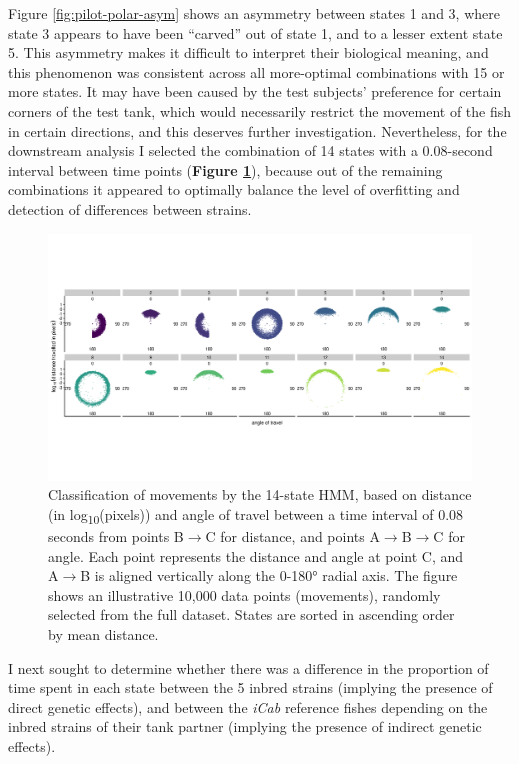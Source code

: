 \documentclass[
]{book}
\begin{document}
Figure \ref{fig:pilot-polar-asym} shows an asymmetry between states 1 and 3, where state 3 appears to have been ``carved'' out of state 1, and to a lesser extent state 5. This asymmetry makes it difficult to interpret their biological meaning, and this phenomenon was consistent across all more-optimal combinations with 15 or more states. It may have been caused by the test subjects' preference for certain corners of the test tank, which would necessarily restrict the movement of the fish in certain directions, and this deserves further investigation. Nevertheless, for the downstream analysis I selected the combination of 14 states with a 0.08-second interval between time points (\textbf{Figure \ref{fig:pilot-polar}}), because out of the remaining combinations it appeared to optimally balance the level of overfitting and detection of differences between strains.



\begin{figure}
\includegraphics[width=1\linewidth]{figs/pilot/polar_all_dge} \caption{Classification of movements by the 14-state HMM, based on distance (in log\textsubscript{10}(pixels)) and angle of travel between a time interval of 0.08 seconds from points B\(\rightarrow\)C for distance, and points A\(\rightarrow\)B\(\rightarrow\)C for angle. Each point represents the distance and angle at point C, and A\(\rightarrow\)B is aligned vertically along the 0-180° radial axis. The figure shows an illustrative 10,000 data points (movements), randomly selected from the full dataset. States are sorted in ascending order by mean distance.}\label{fig:pilot-polar}
\end{figure}

I next sought to determine whether there was a difference in the proportion of time spent in each state between the 5 inbred strains (implying the presence of direct genetic effects), and between the \emph{iCab} reference fishes depending on the inbred strains of their tank partner (implying the presence of indirect genetic effects).
\end{document}
